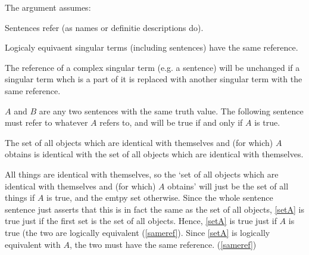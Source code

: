 The argument assumes:

	\begin{thesis} \label{srefer}
	Sentences refer (as names or definitie descriptions do).
	\end{thesis}


	\begin{thesis} \label{sameref}
	Logicaly equivaent singular terms (including sentences) have the same reference.
	\end{thesis}

	
	\begin{thesis} \label{constref}
	The reference of a complex singular term (e.g. a sentence) will be unchanged if a singular term whch is a part of it is replaced with another singular term with the same reference.
	\end{thesis}
	

$A$ and $B$ are any two sentences with the same truth value. 
The following sentence must refer to whatever $A$ refers to, and will be true if and only if $A$ is true.

	\begin{example} \label{setA}
	The set of all objects which are identical with themselves and (for which) $A$ obtains is identical with the set of all objects which are identical with themselves.
	\end{example}

All things are identical with themselves, so the `set of all objects which are identical with themselves and (for which) $A$ obtains' will just be the set of all things if $A$ is true, and the emtpy set otherwise.
Since the whole sentence sentence just asserts that this is in fact the same as the set of all objects, \ref{setA} is true just if the first set is the set of all objects.
Hence, \ref{setA} is true just if $A$ is true (the two are logically equivalent (\ref{sameref}).
Since \ref{setA} is logically equivalent with $A$, the two must have the same reference. 
(\ref{sameref})

